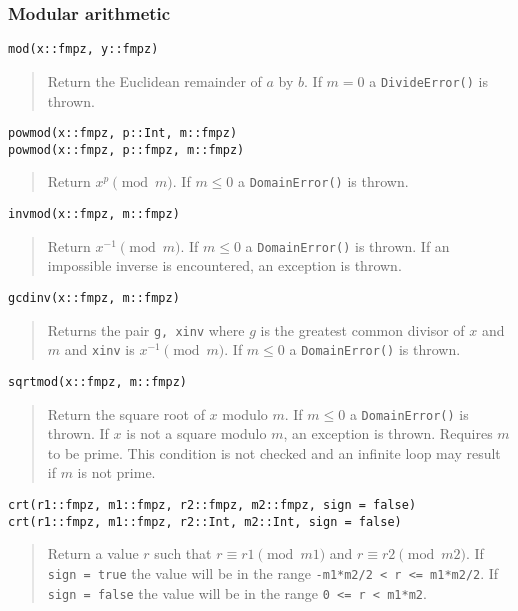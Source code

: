 \documentclass[a4paper,10pt]{article}
\newcommand{\code}{\lstinline}
\newcommand{\desc}[1]{\vspace{-3mm}\begin{quote}#1\end{quote}}
\begin{document}
{{\subsubsection{Modular arithmetic}

\begin{lstlisting}
mod(x::fmpz, y::fmpz)
\end{lstlisting}

\desc{Return the Euclidean remainder of $a$ by $b$. If $m = 0$ a \code{DivideError()} is thrown.}

\begin{lstlisting}
powmod(x::fmpz, p::Int, m::fmpz)
powmod(x::fmpz, p::fmpz, m::fmpz)
\end{lstlisting}

\desc{Return $x^p \pmod{m}$. If $m \leq 0$ a \code{DomainError()} is thrown.}

\begin{lstlisting}
invmod(x::fmpz, m::fmpz)
\end{lstlisting}

\desc{Return $x^{-1} \pmod{m}$. If $m \leq 0$ a \code{DomainError()} is thrown. If
an impossible inverse is encountered, an exception is thrown.}

\begin{lstlisting}
gcdinv(x::fmpz, m::fmpz)
\end{lstlisting}

\desc{Returns the pair \code{g, xinv} where $g$ is the greatest common divisor of
$x$ and $m$ and \code{xinv} is $x^{-1} \pmod{m}$. If $m \leq 0$ a 
\code{DomainError()} is thrown.}

\begin{lstlisting}
sqrtmod(x::fmpz, m::fmpz)
\end{lstlisting}

\desc{Return the square root of $x$ modulo $m$. If $m \leq 0$ a \code{DomainError()}
is thrown. If $x$ is not a square modulo $m$, an exception is thrown. Requires $m$ to
be prime. This condition is not checked and an infinite loop may result if $m$ is
not prime.}

\begin{lstlisting}
crt(r1::fmpz, m1::fmpz, r2::fmpz, m2::fmpz, sign = false)
crt(r1::fmpz, m1::fmpz, r2::Int, m2::Int, sign = false)
\end{lstlisting}

\desc{Return a value $r$ such that $r \equiv r1 \pmod {m1}$ and $r \equiv r2 \pmod{m2}$.
If \code{sign = true} the value will be in the range \code{-m1*m2/2 < r <= m1*m2/2}. If
\code{sign = false} the value will be in the range \code{0 <= r < m1*m2}.}

}}
\end{document}
